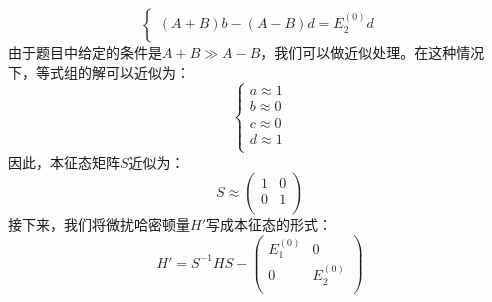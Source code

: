 \begin{solution}
$$\begin{cases}
            (A+B)b - (A-B)d = E_2^{(0)}d \\
        \end{cases}
    $$
    由于题目中给定的条件是$A+B \gg A-B$，我们可以做近似处理。在这种情况下，等式组的解可以近似为：
    $$
        \begin{cases}
            a \approx 1 \\
            b \approx 0 \\
            c \approx 0 \\
            d \approx 1 \\
        \end{cases}
    $$
    因此，本征态矩阵$S$近似为：
    $$
        S \approx \begin{pmatrix}
            1 & 0 \\
            0 & 1 \\
        \end{pmatrix}
    $$
    接下来，我们将微扰哈密顿量$H'$写成本征态的形式：
    $$
        H' = S^{-1} H S - \begin{pmatrix}
            E_1^{(0)} & 0         \\
            0         & E_2^{(0)} \\
        \end{pmatrix}
    $$
\end{solution}


